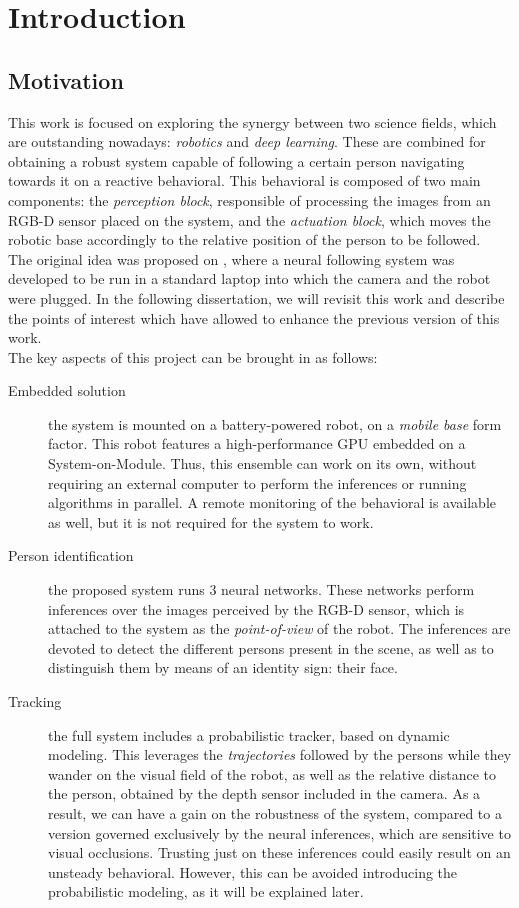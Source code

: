 \chapter{Introduction}
\section{Motivation}
	This work is focused on exploring the synergy between two science fields, which are outstanding nowadays: \textit{robotics} and \textit{deep learning}. These are combined for obtaining a robust system capable of following a certain person navigating towards it on a reactive behavioral. This behavioral is composed of two main components: the \textit{perception block}, responsible of processing the images from an RGB-D sensor placed on the system, and the \textit{actuation block}, which moves the robotic base accordingly to the relative position of the person to be followed.\\
	
	The original idea was proposed on \cite{tfg}, where a neural following system was developed to be run in a standard laptop into which the camera and the robot were plugged. In the following dissertation, we will revisit this work and describe the points of interest which have allowed to enhance the previous version of this work.\\
	
	The key aspects of this project can be brought in as follows:
	\begin{description}
		\item[Embedded solution] the system is mounted on a battery-powered robot, on a \textit{mobile base} form factor. This robot features a high-performance GPU embedded on a System-on-Module. Thus, this ensemble can work on its own, without requiring an external computer to perform the inferences or running algorithms in parallel. A remote monitoring of the behavioral is available as well, but it is not required for the system to work.

		\item[Person identification] the proposed system runs 3 neural networks. These networks perform inferences over the images perceived by the RGB-D sensor, which is attached to the system as the \textit{point-of-view} of the robot. The inferences are devoted to detect the different persons present in the scene, as well as to distinguish them by means of an identity sign: their face.

		\item[Tracking] the full system includes a probabilistic tracker, based on dynamic modeling. This leverages the \textit{trajectories} followed by the persons while they wander on the visual field of the robot, as well as the relative distance to the person, obtained by the depth sensor included in the camera. As a result, we can have a gain on the robustness of the system, compared to a version governed exclusively by the neural inferences, which are sensitive to visual occlusions. Trusting just on these inferences could easily result on an unsteady behavioral. However, this can be avoided introducing the probabilistic modeling, as it will be explained later.
	\end{description}
	
